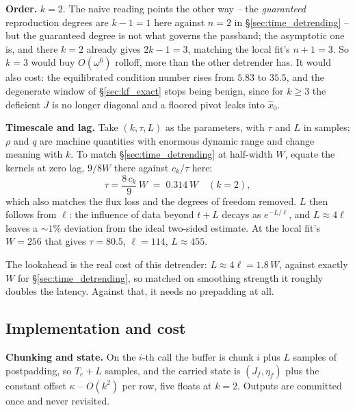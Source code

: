 \documentclass{article}
\numberwithin{equation}{section}   %
\begin{document}
{\bf Order.}  $k=2$.  The naive reading points the other way -- the {\em guaranteed} reproduction degrees are
$k-1 = 1$ here against $n = 2$ in \S\ref{sec:time_detrending} -- but the guaranteed degree is not what governs
the passband; the asymptotic one is, and there $k=2$ already gives $2k-1 = 3$, matching the local fit's $n+1 =
3$.  So $k=3$ would buy $O(\omega^6)$ rolloff, more than the other detrender has.  It would also cost:
the equilibrated condition number rises from $5.83$ to $35.5$, and the degenerate window of
\S\ref{sec:kf_exact} stops being benign, since for $k \ge 3$ the deficient $J$ is no longer diagonal and a
floored pivot leaks into $\hat x_0$.

{\bf Timescale and lag.}  Take $(k, \tau, L)$ as the parameters, with $\tau$ and $L$ in samples; $\rho$ and
$q$ are machine quantities with enormous dynamic range and change meaning with $k$.  To match
\S\ref{sec:time_detrending} at half-width $W$, equate the kernels at zero lag, $9/8W$ there against $c_k/\tau$
here:
\begin{equation}
\tau = \frac{8\,c_k}{9}\,W \;=\; 0.314\,W \quad (k=2) ,
\label{eq:kf_match}
\end{equation}
which also matches the flux loss and the degrees of freedom removed.  $L$ then follows from $\ell$: the
influence of data beyond $t+L$ decays as $e^{-L/\ell}$, and $L \approx 4\ell$ leaves a $\sim\!1\%$ deviation
from the ideal two-sided estimate.  At the local fit's $W = 256$ that gives $\tau = 80.5$, $\ell = 114$,
$L \approx 455$.

The lookahead is the real cost of this detrender: $L \approx 4\ell = 1.8\,W$, against exactly $W$ for
\S\ref{sec:time_detrending}, so matched on smoothing strength it roughly doubles the latency.  Against that,
it needs no prepadding at all.

\subsection{Implementation and cost}
\label{sec:kf_impl}

{\bf Chunking and state.}  On the $i$-th call the buffer is chunk $i$ plus $L$ samples of postpadding, so
$T_c + L$ samples, and the carried state is $(J_f, \eta_f)$ plus the constant offset $\kappa$ -- $O(k^2)$ per
row, five floats at $k=2$.  Outputs are committed once and never revisited.
\end{document}
